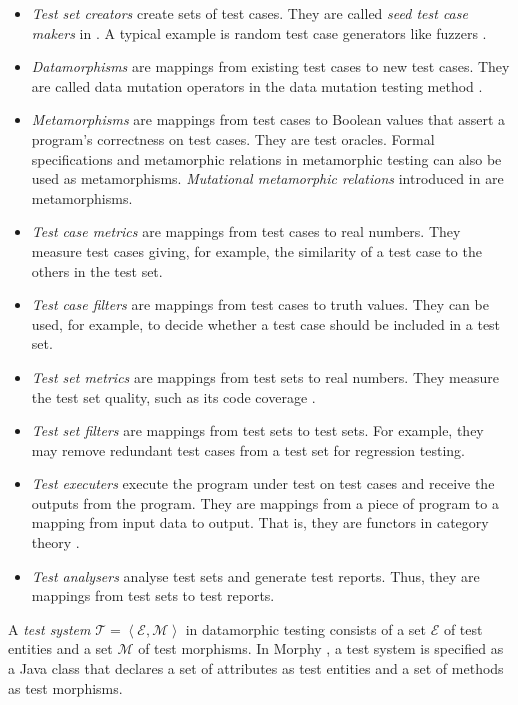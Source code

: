 \documentclass[preprint,1p,authoryear,times]{elsarticle}
\begin{document}
\begin{itemize}
 \item \emph{Test set creators} create sets of test cases. They are called \emph{seed test case makers} in \citep{Zhu2015JFuzz,Datamorphic2019}. A typical example is random test case generators like fuzzers \citep{FuzzTestBook2007}. 
 \item \emph{Datamorphisms} are mappings from existing test cases to new test cases. They are called data mutation operators in the data mutation testing method \citep{DataMutationJournal2009}.
 \item \emph{Metamorphisms} are mappings from test cases to Boolean values that assert a program's correctness on test cases. They are test oracles. Formal specifications and metamorphic relations in metamorphic testing \citep{MetamorphicTestingSurveyChen2018, Zhou2018Untestable} can also be used as metamorphisms. \emph{Mutational metamorphic relations} introduced in \citep{Zhu2015JFuzz} are metamorphisms. 
 \item \emph{Test case metrics} are mappings from test cases to real numbers. They measure test cases giving, for example, the similarity of a test case to the others in the test set. 
 \item \emph{Test case filters} are mappings from test cases to truth values. They can be used, for example, to decide whether a test case should be included in a test set. 
 \item \emph{Test set metrics} are mappings from test sets to real numbers. They measure the test set quality, such as its code coverage \citep{ZhuHallMay1997}.  
 \item \emph{Test set filters} are mappings from test sets to test sets. For example, they may remove redundant test cases from a test set for regression testing. 
 \item \emph{Test executers} execute the program under test on test cases and receive the outputs from the program. They are mappings from a piece of program to a mapping from input data to output. That is, they are functors in category theory \citep{CategoryTheoryBook}. 
 \item \emph{Test analysers} analyse test sets and generate test reports. Thus, they are mappings from test sets to test reports. 
 \end{itemize}
 
A \emph{test system} $\mathscr{T}=\left< \mathscr{E}, \mathscr{M}\right>$ in datamorphic testing consists of a set $\mathscr{E}$ of test entities and a set $\mathscr{M}$ of test morphisms. In Morphy \citep{AITest2020TR}, a test system is specified as a Java class that declares a set of attributes as test entities and a set of methods as test morphisms. 
\end{document}
